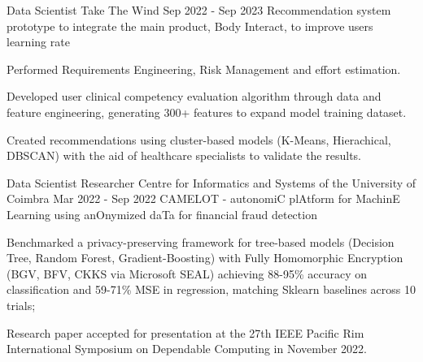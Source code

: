 \begin{cventries}
  \cventry
    {Data Scientist} %
    {Take The Wind} %
    {} %
    {Sep 2022 - Sep 2023} %
    {Recommendation system prototype to integrate the main product, Body Interact, to improve users learning rate} %
    {
    \begin{cvitems} %
     \item {Performed Requirements Engineering, Risk Management and effort estimation.}
      \item {Developed user clinical competency evaluation algorithm through data and feature engineering, generating 300+ features to expand model training dataset.}
      \item {Created recommendations using cluster-based models (K-Means, Hierachical, DBSCAN) with the aid of healthcare specialists to validate the results.}
      \end{cvitems}
    }

  \cventry
    {Data Scientist Researcher} %
    {Centre for Informatics and Systems of the University of Coimbra} %
    {} %
    {Mar 2022 - Sep 2022} %
    {CAMELOT - autonomiC plAtform for MachinE Learning using anOnymized daTa for financial fraud detection} %
    {
      \begin{cvitems} %
      \item {Benchmarked a privacy-preserving framework for tree-based models (Decision Tree, Random Forest, Gradient-Boosting) with Fully Homomorphic Encryption (BGV, BFV, CKKS via Microsoft SEAL) achieving 88-95\% accuracy on classification and 59-71\% MSE in regression, matching Sklearn baselines across 10 trials;}
        \item {Research paper accepted for presentation at the 27th IEEE Pacific Rim International Symposium on Dependable Computing in November 2022.}
      \end{cvitems}
    }

\end{cventries}
